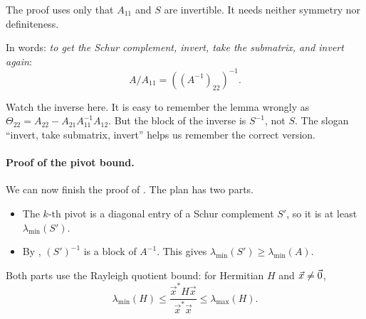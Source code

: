 The proof uses only that $A_{11}$ and $S$ are invertible. It needs neither symmetry nor definiteness.

In words: \emph{to get the Schur complement, invert, take the submatrix, and invert again}:
\begin{equation}
  A/A_{11} = \left((A^{-1})_{22}\right)^{-1}.
\end{equation}

Watch the inverse here. It is easy to remember the lemma wrongly as $\Theta_{22} = A_{22} - A_{21}A_{11}^{-1}A_{12}$. But the block of the inverse is $S^{-1}$, not $S$. The slogan ``invert, take submatrix, invert'' helps us remember the correct version.

\paragraph{Proof of the pivot bound.} We can now finish the proof of . The plan has two parts.
\begin{itemize}
  \item The $k$-th pivot is a diagonal entry of a Schur complement $S'$, so it is at least $\lambda_{\min}(S')$.
  \item By , $(S')^{-1}$ is a block of $A^{-1}$. This gives $\lambda_{\min}(S') \ge \lambda_{\min}(A)$.
\end{itemize}
Both parts use the Rayleigh quotient bound: for Hermitian $H$ and $\vec{x} \ne \vec{0}$,
\begin{equation}
  \label{eq:rayleigh-bound}
  \lambda_{\min}(H) \le \frac{\vec{x}^\ast H\vec{x}}{\vec{x}^\ast\vec{x}} \le \lambda_{\max}(H).
\end{equation}

